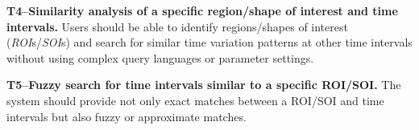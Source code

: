 \noindent\textbf{T4--Similarity analysis of a specific region/shape of interest and time intervals.} 
Users should be able to identify regions/shapes of interest (\emph{ROI}s/\emph{SOI}s) and search for similar time variation patterns at other time intervals without using complex query languages or parameter settings.

\noindent\textbf{T5--Fuzzy search for time intervals similar to a specific ROI/SOI.}
The system should provide not only exact matches between a ROI/SOI and time intervals but also fuzzy or approximate matches. 

